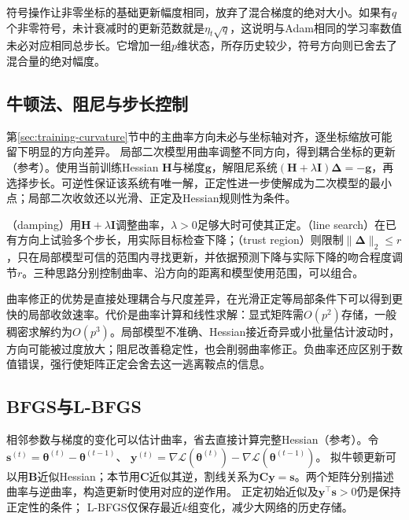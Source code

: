 符号操作让非零坐标的基础更新幅度相同，放弃了混合梯度的绝对大小。如果有$q$个非零符号，未计衰减时的更新范数就是$\eta_t\sqrt q$，这说明与Adam相同的学习率数值未必对应相同总步长。它增加一组$p$维状态，所存历史较少，符号方向则已舍去了混合量的绝对幅度。

\subsection{牛顿法、阻尼与步长控制}
\label{sec:training-second-order}

第\ref{sec:training-curvature}节中的主曲率方向未必与坐标轴对齐，逐坐标缩放可能留下明显的方向差异。
局部二次模型用曲率调整不同方向，得到耦合坐标的更新（参考）。使用当前训练Hessian $\bm H$与梯度$\bm g$，解阻尼系统$(\bm H+\lambda\bm I)\bm\Delta=-\bm g$，再选择步长。可逆性保证该系统有唯一解，正定性进一步使解成为二次模型的最小点；局部二次收敛还以光滑、正定及Hessian规则性为条件。

（damping）用$\bm H+\lambda\bm I$调整曲率，$\lambda>0$足够大时可使其正定。（line search）在已有方向上试验多个步长，用实际目标检查下降；（trust region）则限制$\lVert\bm\Delta\rVert_2\leq r$，只在局部模型可信的范围内寻找更新，并依据预测下降与实际下降的吻合程度调节$r$。三种思路分别控制曲率、沿方向的距离和模型使用范围，可以组合。

曲率修正的优势是直接处理耦合与尺度差异，在光滑正定等局部条件下可以得到更快的局部收敛速率。代价是曲率计算和线性求解：显式矩阵需$O(p^2)$存储，一般稠密求解约为$O(p^3)$。局部模型不准确、Hessian接近奇异或小批量估计波动时，方向可能被过度放大；阻尼改善稳定性，也会削弱曲率修正。负曲率还应区别于数值错误，强行使矩阵正定会舍去这一逃离鞍点的信息。

\subsection{BFGS与L-BFGS}
\label{sec:training-quasi-newton}

相邻参数与梯度的变化可以估计曲率，省去直接计算完整Hessian（参考）。令$\bm s^{(t)}=\bm\theta^{(t)}-\bm\theta^{(t-1)}$、
$\bm y^{(t)}=\nabla\mathcal L(\bm\theta^{(t)})-\nabla\mathcal L(\bm\theta^{(t-1)})$。
拟牛顿更新可以用$\bm B$近似Hessian；本节用$\bm C$近似其逆，割线关系为$\bm C\bm y=\bm s$。两个矩阵分别描述曲率与逆曲率，构造更新时使用对应的逆作用。
正定初始近似及$\bm y^\top\bm s>0$仍是保持正定性的条件；
L-BFGS仅保存最近$k$组变化，减少大网络的历史存储。

